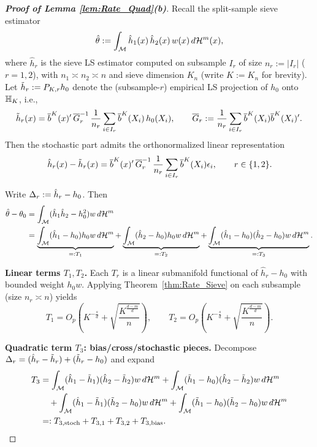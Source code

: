 \documentclass[12pt,american]{article}
\newcommand{\cH}{\mathcal{H}}
\theoremstyle{definition}
\theoremstyle{plain}
\theoremstyle{definition}
\theoremstyle{plain}
\theoremstyle{plain}
\theoremstyle{plain}
\theoremstyle{plain}
\theoremstyle{plain}
\begin{document}
\begin{proof}[\textbf{Proof of Lemma \ref{lem:Rate_Quad}(b)}]
Recall the split-sample sieve estimator
\[
\hat{\theta}:=\int_{{\cal M}}\hat{h}_{1}(x)\,\hat{h}_{2}(x)\,w(x)\,d{\cal H}^{m}(x),
\]
where $\hat h_{r}$ is the sieve LS estimator computed on subsample $I_r$ of size $n_r:=|I_r|$ ($r=1,2$), with $n_1\asymp n_2\asymp n$ and sieve dimension $K_n$ (write $K:=K_n$ for brevity).
Let $\tilde{h}_r:=P_{K,r}h_0$ denote the (subsample-$r$) empirical LS projection of $h_0$ onto ${\mathbb{H}}_{K}$, i.e.,
\[
\tilde{h}_r(x)=\overline{b}^{K}(x)'\,\overline{G}_r^{-1}\,\frac1{n_r}\sum_{i\in I_r}\overline{b}^{K}(X_i)\,h_0(X_i),
\qquad
\overline{G}_r:=\frac1{n_r}\sum_{i\in I_r}\overline{b}^{K}(X_i)\overline{b}^{K}(X_i)'.
\]
Then the stochastic part admits the orthonormalized linear representation
\begin{equation}
\label{eq:ss_stoch_rep}
\hat h_r(x)-\tilde{h}_r(x)=\overline{b}^{K}(x)'\,\overline{G}_r^{-1}\,\frac1{n_r}\sum_{i\in I_r}\overline{b}^{K}(X_i)\epsilon_i,
\qquad r\in\{1,2\}.
\end{equation}

Write $\Delta_r:=\hat h_r-h_0$. Then
\begin{align}
\hat\t-\t_0
&=\int_{\cM}(\hat h_1\hat h_2-h_0^2)w\,d\cH^m \notag\\
&=\underbrace{\int_{\cM}(\hat h_1-h_0)h_0w\,d\cH^m}_{=:T_{1}}
+\underbrace{\int_{\cM}(\hat h_2-h_0)h_0w\,d\cH^m}_{=:T_{2}}
+\underbrace{\int_{\cM}(\hat h_1-h_0)(\hat h_2-h_0)w\,d\cH^m}_{=:T_{3}}.
\label{eq:ss_quad_decomp}
\end{align}

\noindent\textbf{Linear terms $T_1,T_2$.}
Each $T_r$ is a linear submanifold functional of $\hat h_r-h_0$ with bounded weight $h_0w$.
Applying Theorem~\ref{thm:Rate_Sieve} on each subsample (size $n_r\asymp n$) yields
\begin{equation}
\label{eq:ss_lin_terms}
T_{1}=O_p\!\left(K^{-\frac{s}{d}}+\sqrt{\frac{K^{\frac{d-m}{d}}}{n}}\right),
\qquad
T_{2}=O_p\!\left(K^{-\frac{s}{d}}+\sqrt{\frac{K^{\frac{d-m}{d}}}{n}}\right).
\end{equation}

\noindent\textbf{Quadratic term $T_3$: bias/cross/stochastic pieces.}
Decompose $\Delta_r=(\hat h_r-\tilde{h}_r)+(\tilde{h}_r-h_0)$ and expand
\begin{align}
T_3
&=\int_{\cM}(\hat h_1-\td h_1)(\hat h_2-\td h_2)w\,d\cH^m
+\int_{\cM}(\td h_1-h_0)(\hat h_2-\td h_2)w\,d\cH^m \notag\\
&\quad+\int_{\cM}(\hat h_1-\td h_1)(\td h_2-h_0)w\,d\cH^m
+\int_{\cM}(\td h_1-h_0)(\td h_2-h_0)w\,d\cH^m \notag\\
&=:T_{3,\mathrm{stoch}}+T_{3,1}+T_{3,2}+T_{3,\mathrm{bias}}.
\label{eq:ss_T3_split}
\end{align}


\end{proof}
\end{document}
